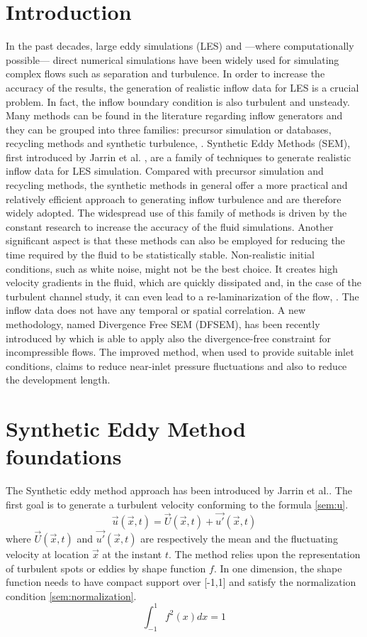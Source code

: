 \documentclass{juliacon}
\begin{document}
\section{Introduction}
In the past decades, large eddy simulations (LES) and ---where computationally possible--- direct numerical simulations have been widely used for simulating complex flows such as separation and turbulence. In order to increase the accuracy of the results, the generation of realistic inflow data for LES is a crucial problem. In fact, the inflow boundary condition is also turbulent and unsteady. Many methods can be found in the literature regarding inflow generators and they can be grouped into three families: precursor simulation or databases, recycling methods and synthetic turbulence, \cite{Pamies}. Synthetic Eddy Methods (SEM), first introduced by Jarrin et al. \cite{Jarrin2006}, are a family of techniques to generate realistic inflow data for LES simulation. Compared with precursor simulation and recycling methods, the synthetic methods in general offer a more practical and relatively efficient approach to generating inflow turbulence and are therefore widely adopted. The widespread use of this family of methods is driven by the constant research to increase the accuracy of the fluid simulations. Another significant aspect is that these methods can also be employed for reducing the time required by the fluid to be statistically stable. Non-realistic initial conditions, such as white noise, might not be the best choice. It creates high velocity gradients in the fluid, which are quickly dissipated and, in the case of the turbulent channel study, it can even lead to a re-laminarization of the flow, \cite{LUND1998233}. The inflow data does not have any temporal or spatial correlation. 
A new methodology, named Divergence Free SEM (DFSEM), has been recently introduced by \cite{Poletto2013} which is able to apply also the divergence-free constraint for incompressible flows. The  improved  method,  when  used  to  provide suitable inlet  conditions, claims to reduce  near-inlet  pressure  fluctuations and also to reduce the development length.


\section{Synthetic Eddy Method foundations}
The Synthetic eddy method approach has been introduced by Jarrin et al.\cite{Jarrin2006}.
The first goal is to generate a turbulent velocity conforming to the formula \eqref{sem:u}.
\begin{equation}
    \Vec{u}(\Vec{x},t) = \Vec{U}(\Vec{x},t) +  \Vec{u'}(\Vec{x},t)
    \label{sem:u}
\end{equation}
where $\Vec{U}(\Vec{x},t)$ and $\Vec{u'}(\Vec{x},t)$ are respectively the mean and the fluctuating velocity at location $\Vec{x}$ at the instant $t$. 
The method relies upon the representation of turbulent spots or eddies by shape function $f$. In one dimension, the shape function needs to have compact support over [-1,1] and satisfy the normalization condition \eqref{sem:normalization}.
\begin{equation}
    \int_{-1}^{1} f^2(x)dx = 1
    \label{sem:normalization}
\end{equation}
\end{document}
